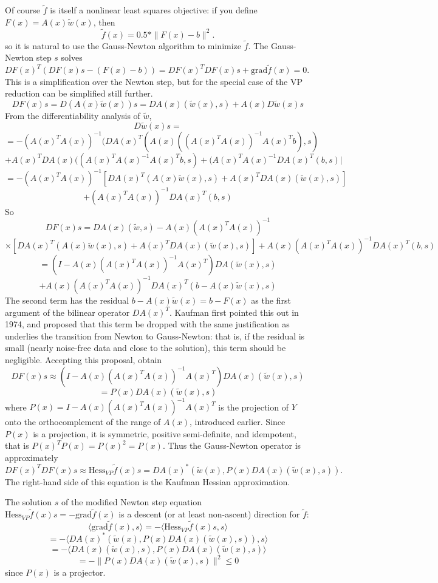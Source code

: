 Of course $\tilde{f}$ is itself a nonlinear least squares objective: if you define $F(x)=A(x)\tilde{w}(x)$, then 
$$
\tilde{f}(x) = 0.5*\|F(x)-b\|^2.
$$
so it is natural to use the Gauss-Newton algorithm to minimize $\tilde{f}$. The Gauss-Newton step $s$ solves $DF(x)^T(DF(x)s-(F(x)-b))=DF(x)^TDF(x)s+\mbox{grad}\tilde{f}(x)=0$. This is a simplification over the Newton step, but for the special case of the VP reduction can be simplified still further.
$$
DF(x)s = D(A(x)\tilde{w}(x))s = DA(x)(\tilde{w}(x),s) + A(x)D\tilde{w}(x)s
$$
From the differentiability analysis of $\tilde{w}$,
$$
D\tilde{w}(x)s = 
$$
$$
=-(A(x)^TA(x))^{-1}(DA(x)^T(A(x)((A(x)^TA(x))^{-1}A(x)^Tb),s)
$$
$$
+ A(x)^T DA(x)((A(x)^TA(x)^{-1}A(x)^Tb,s) + (A(x)^TA(x)^{-1}DA(x)^T(b,s)|
$$
$$
= -(A(x)^TA(x))^{-1}[DA(x)^T(A(x)\tilde{w}(x),s) + A(x)^TDA(x)(\tilde{w}(x),s)]
$$
$$
+ (A(x)^TA(x))^{-1}DA(x)^T(b,s)
$$
So 
$$
DF(x)s = DA(x)(\tilde{w},s) - A(x) (A(x)^TA(x))^{-1}
$$
$$
\times [DA(x)^T(A(x)\tilde{w}(x),s) + A(x)^TDA(x)(\tilde{w}(x),s)] + A(x)(A(x)^TA(x))^{-1}DA(x)^T(b,s)
$$
$$
= (I-A(x)(A(x)^TA(x))^{-1}A(x)^T)DA(\tilde{w}(x),s)
$$
$$
+ A(x)(A(x)^TA(x))^{-1}DA(x)^T(b-A(x)\tilde{w}(x),s)
$$
The second term has the residual $b-A(x)\tilde{w}(x)=b-F(x)$ as the first argument of the bilinear operator $DA(x)^T$. Kaufman first pointed this out in 1974, and proposed that this term be dropped with the same justification as underlies the transition from Newton to Gauss-Newton: that is, if the residual is small (nearly noise-free data and close to the solution), this term should be negligible. Accepting this proposal, obtain 
$$
DF(x)s \approx (I-A(x)(A(x)^TA(x))^{-1}A(x)^T)DA(x)(\tilde{w}(x),s)
$$
$$
= P(x)DA(x)(\tilde{w}(x),s)
$$
where $P(x)=I-A(x)(A(x)^TA(x))^{-1}A(x)^T$ is the projection of $Y$ onto the orthocomplement of the range of $A(x)$, introduced earlier.
Since $P(x)$ is a projection, it is symmetric, positive semi-definite, and idempotent, that is $P(x)^TP(x)=P(x)^2=P(x)$. Thus the Gauss-Newton operator is approximately
$$
DF(x)^TDF(x)s \approx \mbox{Hess}_{VP}\tilde{f}(x)s = DA(x)^*(\tilde{w}(x),P(x)DA(x)(\tilde{w}(x),s)).
$$
The right-hand side of this equation is the Kaufman Hessian approximation.

The solution $s$ of the modified Newton step equation $\mbox{Hess}_{VP}\tilde {f}(x)s=-\mbox{grad}\tilde{f}(x)$ is a descent (or at least non-ascent) direction for $\tilde{f}$:
$$
\langle \mbox{grad}\tilde{f}(x), s \rangle 
= -\langle \mbox{Hess}_{VP}\tilde{f}(x)s, s\rangle 
$$
$$
=-\langle DA(x)^*(\tilde{w}(x),P(x)DA(x)(\tilde{w}(x),s)),s\rangle
$$
$$
= - \langle DA(x)(\tilde{w}(x),s),P(x)DA(x)(\tilde{w}(x),s)\rangle
$$
$$
= -\|P(x)DA(x)(\tilde{w}(x),s)\|^2 \le 0
$$
since $P(x)$ is a projector. 

